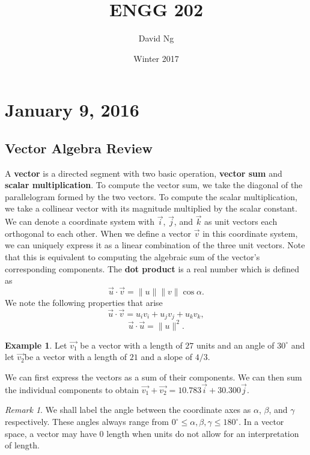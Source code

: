 \documentclass[11pt]{article}
\theoremstyle{plain} %
\theoremstyle{definition}
\theoremstyle{example}
\newtheorem*{example}{Example}
\theoremstyle{remark}
\newtheorem*{remark}{Remark}
\begin{document}
\title{ENGG 202}
\author{David Ng}
\date{Winter 2017}
\maketitle

\tableofcontents

\eject


\section{January 9, 2016}
\subsection{Vector Algebra Review}

A \textbf{vector} is a directed segment with two basic operation, \textbf{vector sum} and \textbf{scalar multiplication}. To compute the vector sum, we take the diagonal of the parallelogram formed by the two vectors. To compute the scalar multiplication, we take a collinear vector with its magnitude multiplied by the scalar constant. We can denote a coordinate system with $\vec{i}$, $\vec{j}$, and $\vec{k}$ as unit vectors each orthogonal to each other. When we define a vector $\vec{v}$ in this coordinate system, we can uniquely express it as a linear combination of the three unit vectors. Note that this is equivalent to computing the algebraic sum of the vector's corresponding components. The \textbf{dot product} is a real number which is defined as 
$$\vec{u} \cdot \vec{v} = \|u\|\|v\|\cos\alpha.$$
We note the following properties that arise
$$\vec{u} \cdot \vec{v} = u_iv_i + u_jv_j + u_kv_k,$$
$$\vec{u} \cdot \vec{u} = \|u\|^2.$$
\begin{example}
Let $\vec{v_1}$ be a vector with a length of $27$ units and an angle of $30^{\circ}$ and let $\vec{v_2} $be a vector with a length of $21$ and a slope of $4/3$.
\end{example}
We can first express the vectors as a sum of their components. We can then sum the individual components to obtain $\vec{v_1} + \vec{v_2} = 10.783\vec{i} + 30.300\vec{j}$.

\begin{remark}We shall label the angle between the coordinate axes as $\alpha$, $\beta$, and $\gamma$ respectively. These angles always range from $0^{\circ} \leq \alpha, \beta, \gamma \leq 180^{\circ}$. In a vector space, a vector may have $0$ length when units do not allow for an interpretation of length. 
\end{remark}
\end{document}
